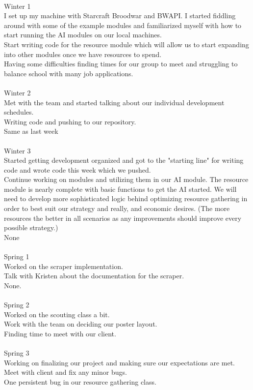 \\
Winter 1\\
I set up my machine with Starcraft Broodwar and BWAPI. I started fiddling around with some of the example modules and familiarized myself with how to start running the AI modules on our local machines.\\ Start writing code for the resource module which will allow us to start expanding into other modules once we have resources to spend.\\ Having some difficulties finding times for our group to meet and struggling to balance school with many job applications.\\
\\
Winter 2\\
Met with the team and started talking about our individual development schedules.\\ Writing code and pushing to our repository.\\ Same as last week\\
\\
Winter 3\\
Started getting development organized and got to the "starting line" for writing code and wrote code this week which we pushed.\\ Continue working on modules and utilizing them in our AI module. The resource module is nearly complete with basic functions to get the AI started. We will need to develop more sophisticated logic behind optimizing resource gathering in order to best suit our strategy and really, and economic desires. (The more resources the better in all scenarios as any improvements should improve every possible strategy.)\\ None\\
\\
Spring 1\\
Worked on the scraper implementation.\\ Talk with Kristen about the documentation for the scraper.\\ None.\\
\\
Spring 2\\
Worked on the scouting class a bit.\\ Work with the team on deciding our poster layout.\\ Finding time to meet with our client.\\
\\
Spring 3\\
Working on finalizing our project and making sure our expectations are met.\\ Meet with client and fix any minor bugs.\\ One persistent bug in our resource gathering class.\\
